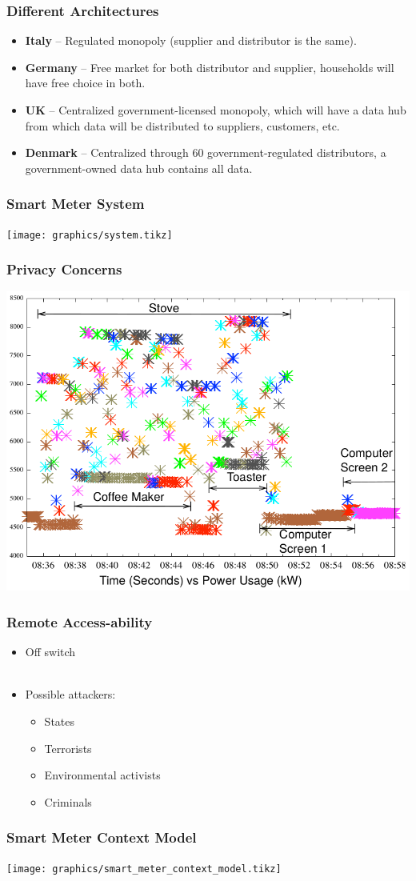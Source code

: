 \begin{frame}
  \frametitle{Different Architectures}
  \begin{itemize}
	\item \textbf{Italy} -- Regulated monopoly (supplier and distributor is the same).
	\item \textbf{Germany} -- Free market for both distributor and supplier, households will have free choice in both.
	\item \textbf{UK} -- Centralized government-licensed monopoly, which will have a data hub from which data will be distributed to suppliers, customers, etc.
	\item \textbf{Denmark} -- Centralized through 60 government-regulated distributors, a government-owned data hub contains all data.
\end{itemize}

\end{frame}

\begin{frame}
  \frametitle{Smart Meter System}
  \texttt{[image: graphics/system.tikz]}
\end{frame}

\begin{frame}
  \frametitle{Privacy Concerns}
  \includegraphics[width=.8\textwidth]{graphics/detailed.png}
\end{frame}

\begin{frame}
  \frametitle{Remote Access-ability}
  \begin{itemize}
  \item Off switch
    \\~\\
  \item Possible attackers:
    \begin{itemize}
    \item States
    \item Terrorists
    \item Environmental activists
    \item Criminals
    \end{itemize}
  \end{itemize}
\end{frame}

\begin{frame}
  \frametitle{Smart Meter Context Model}
  \texttt{[image: graphics/smart\_meter\_context\_model.tikz]}
\end{frame}
